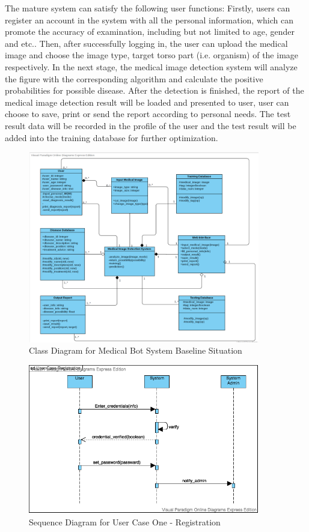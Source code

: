 \documentclass[11pt,bibliography=totocnumbered]{article}
\begin{document}
  The mature system can satisfy the following user functions:
  Firstly, users can register an account in the system with all the personal information, which can promote the accuracy of examination, including but not limited to age, gender and etc.. Then, after successfully logging in, the user can upload the  medical image and choose the image type, target torso part (i.e. organism) of the image respectively. In the next stage, the medical image detection system will analyze the figure with the corresponding algorithm and calculate the positive probabilities for possible disease. After the detection is finished, the report of the medical image detection result will be loaded and presented to user, user can choose to save, print or send the report according to personal needs. The test result data will be recorded in the profile of the user and the test result will be added into the training database for further optimization.
  
  \begin{figure}[H]
  	\centering
  	\includegraphics[width=0.9\textwidth]{figures/class}
  	\caption{Class Diagram for Medical Bot System Baseline Situation}
  	\label{fig:class-diagram}
  \end{figure}

  \begin{figure}[H]
	\centering
	\includegraphics[width=0.9\textwidth]{figures/registration}
	\caption{Sequence Diagram for User Case One - Registration}
	\label{fig:registration}
  \end{figure}
\end{document}
